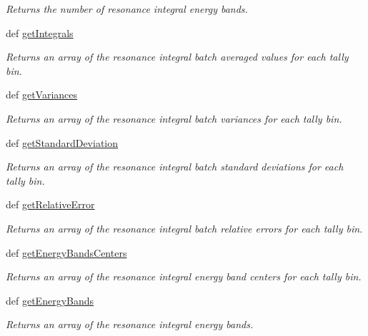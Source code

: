 \begin{DoxyCompactItemize}
\begin{DoxyCompactList}\small\item\em Returns the number of resonance integral energy bands. \end{DoxyCompactList}\item 
def \hyperlink{classpinspec_1_1process_1_1RIEff_a70a5b0c127c6d45b6071b4f4b827f9f0}{get\-Integrals}
\begin{DoxyCompactList}\small\item\em Returns an array of the resonance integral batch averaged values for each tally bin. \end{DoxyCompactList}\item 
def \hyperlink{classpinspec_1_1process_1_1RIEff_a916110ec4e0a682acd4b50aefcc9829c}{get\-Variances}
\begin{DoxyCompactList}\small\item\em Returns an array of the resonance integral batch variances for each tally bin. \end{DoxyCompactList}\item 
def \hyperlink{classpinspec_1_1process_1_1RIEff_a9f30b37d214cb834f2b2fb2f8663d6d4}{get\-Standard\-Deviation}
\begin{DoxyCompactList}\small\item\em Returns an array of the resonance integral batch standard deviations for each tally bin. \end{DoxyCompactList}\item 
def \hyperlink{classpinspec_1_1process_1_1RIEff_a6f44452b15380d62bdbd1fb7cc5c0894}{get\-Relative\-Error}
\begin{DoxyCompactList}\small\item\em Returns an array of the resonance integral batch relative errors for each tally bin. \end{DoxyCompactList}\item 
def \hyperlink{classpinspec_1_1process_1_1RIEff_a3bb8f9f0789d62b5662f181fb1e25b03}{get\-Energy\-Bands\-Centers}
\begin{DoxyCompactList}\small\item\em Returns an array of the resonance integral energy band centers for each tally bin. \end{DoxyCompactList}\item 
def \hyperlink{classpinspec_1_1process_1_1RIEff_a833ecea30944705d16b8ed514de32b2b}{get\-Energy\-Bands}
\begin{DoxyCompactList}\small\item\em Returns an array of the resonance integral energy bands. \end{DoxyCompactList}\item 

\end{DoxyCompactItemize}

